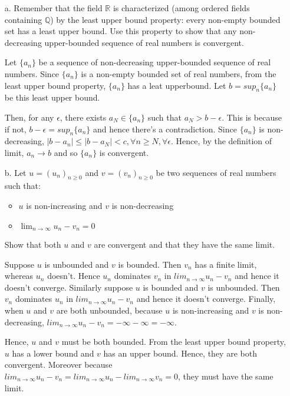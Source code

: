 \documentclass[11pt]{article}
\newcommand{\R}{\mathbb{R}}                     %
\begin{document}
\begin{itemize}
    \item[a.] Remember that the field $\R$ is characterized (among ordered
        fields containing $\mathbb{Q}$) by the least upper bound property:
        every non-empty bounded set has a least upper bound. Use this property
        to show that any non-decreasing upper-bounded sequence of real numbers
        is convergent.

\color{blue}
Let $\{a_n\}$ be a sequence of non-decreasing upper-bounded sequence of real numbers. Since $\{a_n\}$ is a non-empty bounded set of real numbers, from the least upper bound property, $\{a_n\}$ has a leat upperbound. Let $b=sup_n \{a_n\}$ be this least upper bound.

Then, for any $\epsilon$, there exists $a_N \in \{a_n\}$ such that $a_N > b-\epsilon$. This is because if not, $b-\epsilon=sup_n \{a_n\}$ and hence there's a contradiction. Since $\{a_n\}$ is non-decreasing, $|b-a_n| \leq |b-a_N| < c, \forall n \geq N, \forall \epsilon$. Hence, by the definition of limit, $a_n \rightarrow b$ and so $\{a_n\}$ is convergent.
\color{black}

\item[b.] Let $u = (u_n)_{n\geq 0}$ and $v = (v_n)_{n\geq 0}$ be two sequences of
real numbers such that:
\begin{itemize}
    \item $u$ is non-increasing and $v$ is non-decreasing
    \item $\lim_{n\to\infty} u_n - v_n = 0$
\end{itemize}
Show that both $u$ and $v$ are convergent and that they have the same limit.

\color{blue}
Suppose $u$ is unbounded and $v$ is bounded. Then $v_n$ has a finite limit, whereas $u_n$ doesn't. Hence $u_n$ dominates $v_n$ in $lim_{n\rightarrow \infty}u_n-v_n$ and hence it doesn't converge. Similarly suppose $u$ is bounded and $v$ is unbounded. Then $v_n$ dominates $u_n$ in $lim_{n\rightarrow \infty}u_n-v_n$ and hence it doesn't converge. Finally, when $u$ and $v$ are both unbounded, because $u$ is non-increasing and $v$ is non-decreasing, $lim_{n\rightarrow \infty}u_n-v_n=-\infty-\infty=-\infty$.

Hence, $u$ and $v$ must be both bounded. From the least upper bound property, $u$ has a lower bound and $v$ has an upper bound. Hence, they are both convergent. Moreover because $lim_{n\rightarrow \infty}u_n-v_n=lim_{n\rightarrow \infty}u_n-lim_{n\rightarrow \infty}v_n=0$, they must have the same limit.
\color{black}



\end{itemize}
\end{document}
